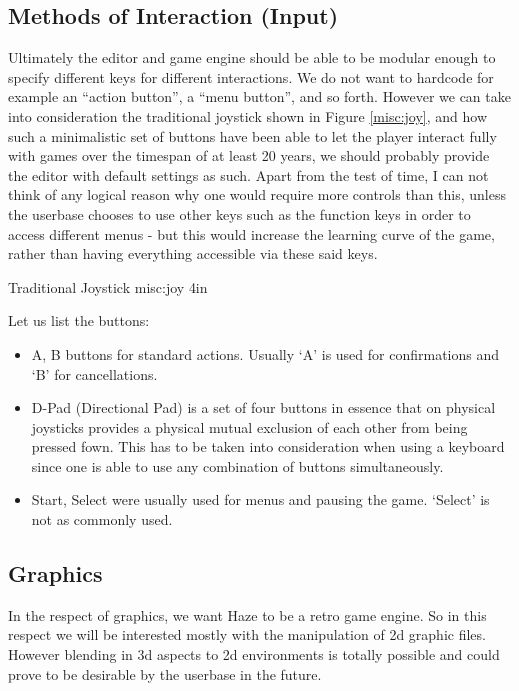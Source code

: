 \subsection{Methods of Interaction (Input)}

Ultimately the editor and game engine should be able to be modular enough to 
specify different keys for different interactions. We do not want to hardcode
for example an ``action button'', a ``menu button'', and so forth. However we
can take into consideration the traditional joystick shown in Figure 
\ref{misc:joy}, and how such a minimalistic set of buttons have been able to
let the player interact fully with games over the timespan of at least 20 years,
we should probably provide the editor with default settings as such. Apart from
the test of time, I can not think of any logical reason why one would require
more controls than this, unless the userbase chooses to use other keys such as 
the function keys in order to access different menus - but this would increase
the learning curve of the game, rather than having everything accessible via
these said keys.

%
       {Traditional Joystick}%
       {misc:joy}%
       {4in}

Let us list the buttons: 
\begin{itemize}
\item{A, B} buttons for standard actions. Usually `A' is used for confirmations
and `B' for cancellations.
\item{D-Pad (Directional Pad)} is a set of four buttons in essence that on
physical joysticks provides a physical mutual exclusion of each other from 
being pressed fown. This has to be taken into consideration when using a
keyboard since one is able to use any combination of buttons simultaneously.
\item{Start, Select} were usually used for menus and pausing the game. `Select'
is not as commonly used.
\end{itemize}

\subsection{Graphics}

In the respect of graphics, we want Haze to be a retro game engine. So in this
respect we will be interested mostly with the manipulation of 2d graphic files.
However blending in 3d aspects to 2d environments is totally possible and could
prove to be desirable by the userbase in the future.

